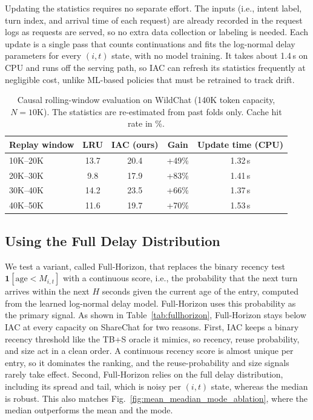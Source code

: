 \documentclass{article}
\begin{document}
Updating the statistics requires no separate effort. The inputs (i.e., intent label, turn index, and arrival time of each request) are already recorded in the request logs as requests are served, so no extra data collection or labeling is needed. Each update is a single pass that counts continuations and fits the log-normal delay parameters for every \((i,t)\) state, with no model training. It takes about 1.4\,s on CPU and runs off the serving path, so IAC can refresh its statistics frequently at negligible cost, unlike ML-based policies that must be retrained to track drift.

\begin{table}[h]
\centering
\caption{ Causal rolling-window evaluation on WildChat (140K token capacity, \(N=10\)K). The statistics are re-estimated from past folds only. Cache hit rate in \%.}
\label{tab:rolling_full}
\small
 \begin{tabular}{lcccc}
\toprule
Replay window & LRU & IAC (ours) & Gain & Update time (CPU) \\
\midrule
10K--20K & 13.7 & 20.4 & +49\% & 1.32\,s \\
20K--30K & 9.8  & 17.9 & +83\% & 1.41\,s \\
30K--40K & 14.2 & 23.5 & +66\% & 1.37\,s \\
40K--50K & 11.6 & 19.7 & +70\% & 1.53\,s \\
\bottomrule
\end{tabular}
\end{table}




\subsection{Using the Full Delay Distribution}
We test a variant, called Full-Horizon, that replaces the binary recency test \(\mathbf{1}[\mathrm{age}<M_{i,t}]\) with a continuous score, i.e., the probability that the next turn arrives within the next \(H\) seconds given the current age of the entry, computed from the learned log-normal delay model. Full-Horizon uses this probability as the primary signal. As shown in Table~\ref{tab:fullhorizon}, Full-Horizon stays below IAC at every capacity on ShareChat for two reasons. First, IAC keeps a binary recency threshold like the TB+S oracle it mimics, so recency, reuse probability, and size act in a clean order. A continuous recency score is almost unique per entry, so it dominates the ranking, and the reuse-probability and size signals rarely take effect. Second, Full-Horizon relies on the full delay distribution, including its spread and tail, which is noisy per \((i,t)\) state, whereas the median is robust. This also matches Fig.~\ref{fig:mean_meadian_mode_ablation}, where the median outperforms the mean and the mode.
\end{document}

